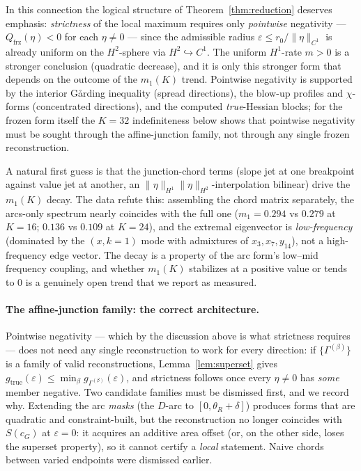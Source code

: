 \documentclass[11pt]{amsart}
\theoremstyle{plain}
\theoremstyle{definition}
\newcommand{\cG}{c_{G}}
\begin{document}
In this connection the logical structure of
Theorem~\ref{thm:reduction} deserves emphasis: \emph{strictness} of the
local maximum requires only \emph{pointwise} negativity ---
$Q_{\mathrm{frz}}(\eta)<0$ for each $\eta\neq0$ --- since the
admissible radius $\varepsilon\leq r_{0}/\|\eta\|_{C^{1}}$ is already
uniform on the $H^{2}$-sphere via $H^{2}\hookrightarrow C^{1}$.  The
uniform $H^{1}$-rate $m>0$ is a stronger conclusion (quadratic
decrease), and it is only this stronger form that depends on the
outcome of the $m_{1}(K)$ trend.  Pointwise negativity is supported by
the interior G\aa rding inequality (spread directions), the blow-up
profiles and $\chi$-forms (concentrated directions), and the computed
\emph{true}-Hessian blocks; for the frozen form itself the $K=32$
indefiniteness below shows that pointwise negativity must be sought
through the affine-junction family, not through any single frozen
reconstruction.

A natural first guess is that the junction-chord terms (slope jet at
one breakpoint against value jet at another, an
$\|\eta\|_{H^{1}}\|\eta\|_{H^{2}}$-interpolation bilinear) drive the
$m_{1}(K)$ decay.  The data refute this: assembling the chord matrix
separately, the arcs-only spectrum nearly coincides with the full one
($m_{1} = 0.294$ vs $0.279$ at $K=16$; $0.136$ vs $0.109$ at $K=24$),
and the extremal eigenvector is \emph{low-frequency} (dominated by the
$(x,k{=}1)$ mode with admixtures of $x_{3},x_{7},y_{14}$), not a
high-frequency edge vector.  The decay is a property of the arc form's
low--mid frequency coupling, and whether $m_{1}(K)$ stabilizes at a
positive value or tends to $0$ is a genuinely open trend that we
report as measured.

\paragraph{The affine-junction family: the correct architecture.}
Pointwise negativity --- which by the discussion above is what
strictness requires --- does not need any single reconstruction to
work for every direction: if $\{\Gamma^{(\beta)}\}$ is a family of
valid reconstructions, Lemma~\ref{lem:superset} gives
$g_{\mathrm{true}}(\varepsilon)\leq\min_{\beta}g_{\Gamma^{(\beta)}}
(\varepsilon)$, and strictness follows once every $\eta\neq0$ has
\emph{some} member negative.  Two candidate families must be
dismissed first, and we record why.  Extending the arc \emph{masks}
(the $D$-arc to $[0,\theta_{R}+\delta]$) produces forms that are
quadratic and constraint-built, but the reconstruction no longer
coincides with $S(\cG)$ at $\varepsilon=0$: it acquires an additive
area offset (or, on the other side, loses the superset property), so
it cannot certify a \emph{local} statement.  Naive chords between
varied endpoints were dismissed earlier.
\end{document}
